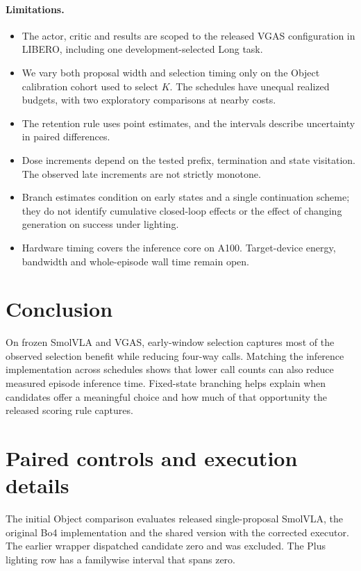 \documentclass{article}
\begin{document}
\paragraph{Limitations.}
\begin{itemize}
\setlength{\itemsep}{1pt}
\item The actor, critic and results are scoped to the released VGAS
configuration in LIBERO, including one development-selected Long task.
\item We vary both proposal width and selection timing only on the
Object calibration cohort used to select \(K\). The schedules have unequal
realized budgets, with two exploratory comparisons at nearby costs.
\item The retention rule uses point estimates, and the intervals
describe uncertainty in paired differences.
\item Dose increments depend on the tested prefix, termination and
state visitation. The observed late increments are not strictly monotone.
\item Branch estimates condition on early states and a single continuation
scheme; they do not identify cumulative closed-loop effects or the effect
of changing generation on success under lighting.
\item Hardware timing covers the inference core on A100. Target-device
energy, bandwidth and whole-episode wall time remain open.
\end{itemize}

\section{Conclusion}
On frozen SmolVLA and VGAS, early-window selection captures most of the
observed selection benefit while reducing four-way calls. Matching the
inference implementation across schedules shows that lower call counts
can also reduce measured episode inference time. Fixed-state branching
helps explain when candidates offer a meaningful choice and how much of
that opportunity the released scoring rule captures.



\clearpage
\appendix
\section{Paired controls and execution details}
The initial Object comparison evaluates released single-proposal SmolVLA,
the original Bo4 implementation and the shared version with the corrected
executor. The earlier wrapper dispatched candidate zero and was excluded.
The Plus lighting row has a familywise interval that spans zero.

\end{document}

